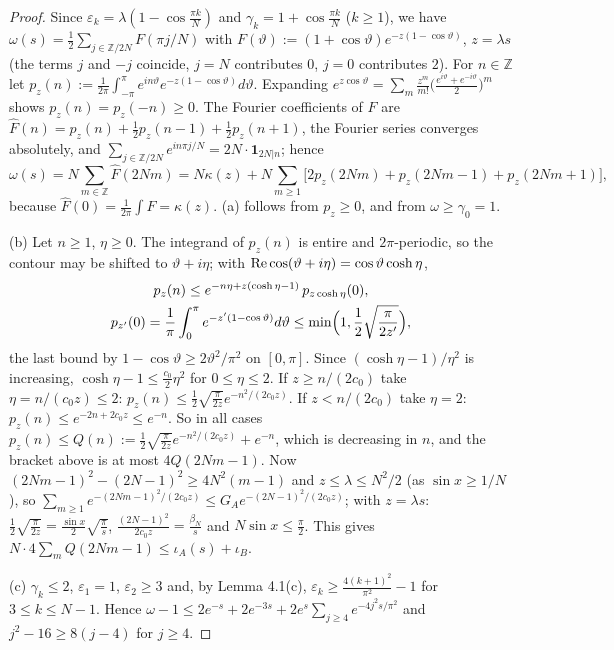 \documentclass[11pt,a4paper]{article}
\theoremstyle{definition}
\theoremstyle{remark}
\begin{document}
\begin{proof}
Since $\varepsilon_k=\lambda(1-\cos\frac{\pi k}N)$ and $\gamma_k=1+\cos\frac{\pi k}N$ ($k\ge1$), we have $\omega(s)=\frac12\sum_{j\in\mathbb Z/2N}F(\pi j/N)$ with $F(\vartheta):=(1+\cos\vartheta)e^{-z(1-\cos\vartheta)}$, $z=\lambda s$ (the terms $j$ and $-j$ coincide, $j=N$ contributes $0$, $j=0$ contributes $2$). For $n\in\mathbb Z$ let $p_z(n):=\frac1{2\pi}\int_{-\pi}^\pi e^{in\vartheta}e^{-z(1-\cos\vartheta)}d\vartheta$. Expanding $e^{z\cos\vartheta}=\sum_m\frac{z^m}{m!}\bigl(\frac{e^{i\vartheta}+e^{-i\vartheta}}2\bigr)^m$ shows $p_z(n)=p_z(-n)\ge0$. The Fourier coefficients of $F$ are $\hat F(n)=p_z(n)+\frac12p_z(n-1)+\frac12p_z(n+1)$, the Fourier series converges absolutely, and $\sum_{j\in\mathbb Z/2N}e^{in\pi j/N}=2N\cdot\mathbf 1_{2N|n}$; hence
\begin{equation*}
\omega(s)=N\sum_{m\in\mathbb Z}\hat F(2Nm)=N\kappa(z)+N\sum_{m\ge1}\bigl[2p_z(2Nm)+p_z(2Nm-1)+p_z(2Nm+1)\bigr],
\end{equation*}
because $\hat F(0)=\frac1{2\pi}\int F=\kappa(z)$. (a) follows from $p_z\ge0$, and from $\omega\ge\gamma_0=1$.

(b) Let $n\ge1$, $\eta\ge0$. The integrand of $p_z(n)$ is entire and $2\pi$-periodic, so the contour may be shifted to $\vartheta+i\eta$; with ${\rm Re}\cos(\vartheta+i\eta)=\cos\vartheta\cosh\eta$,
\begin{gather*}
p_z(n)\le e^{-n\eta+z(\cosh\eta-1)}\,p_{z\cosh\eta}(0), \\
p_{z'}(0)=\frac1\pi\int_0^\pi e^{-z'(1-\cos\vartheta)}d\vartheta\le\min\Bigl(1,\frac12\sqrt{\frac{\pi}{2z'}}\Bigr),
\end{gather*}
the last bound by $1-\cos\vartheta\ge2\vartheta^2/\pi^2$ on $[0,\pi]$. Since $(\cosh\eta-1)/\eta^2$ is increasing, $\cosh\eta-1\le\frac{c_0}{2}\eta^2$ for $0\le\eta\le2$. If $z\ge n/(2c_0)$ take $\eta=n/(c_0z)\le2$: $p_z(n)\le\frac12\sqrt{\frac{\pi}{2z}}e^{-n^2/(2c_0z)}$. If $z<n/(2c_0)$ take $\eta=2$: $p_z(n)\le e^{-2n+2c_0z}\le e^{-n}$. So in all cases $p_z(n)\le Q(n):=\frac12\sqrt{\frac\pi{2z}}e^{-n^2/(2c_0z)}+e^{-n}$, which is decreasing in $n$, and the bracket above is at most $4Q(2Nm-1)$. Now $(2Nm-1)^2-(2N-1)^2\ge4N^2(m-1)$ and $z\le\lambda\le N^2/2$ (as $\sin x\ge1/N$), so $\sum_{m\ge1}e^{-(2Nm-1)^2/(2c_0z)}\le G_Ae^{-(2N-1)^2/(2c_0z)}$; with $z=\lambda s$: $\frac12\sqrt{\frac{\pi}{2z}}=\frac{\sin x}{2}\sqrt{\frac\pi s}$, $\frac{(2N-1)^2}{2c_0z}=\frac{\beta_N}{s}$ and $N\sin x\le\frac\pi2$. This gives $N\cdot4\sum_mQ(2Nm-1)\le\iota_A(s)+\iota_B$.

(c) $\gamma_k\le2$, $\varepsilon_1=1$, $\varepsilon_2\ge3$ and, by Lemma 4.1(c), $\varepsilon_k\ge\frac{4(k+1)^2}{\pi^2}-1$ for $3\le k\le N-1$. Hence $\omega-1\le2e^{-s}+2e^{-3s}+2e^{s}\sum_{j\ge4}e^{-4j^2s/\pi^2}$ and $j^2-16\ge8(j-4)$ for $j\ge4$.
\end{proof}
\end{document}
